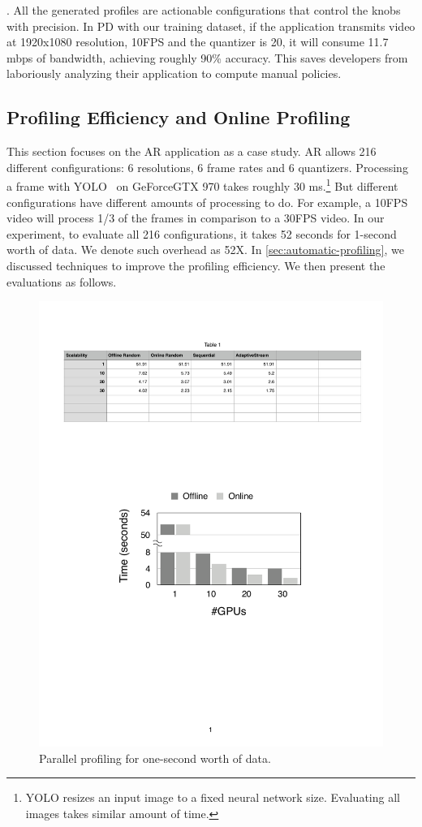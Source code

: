 . All the generated profiles are actionable
configurations that control the knobs with precision. In PD with our training
dataset, if the application transmits video at 1920x1080 resolution, 10FPS and
the quantizer is 20, it will consume 11.7 mbps of bandwidth, achieving roughly
90\% accuracy. This saves developers from laboriously analyzing their
application to compute manual policies.

\subsection{Profiling Efficiency and Online Profiling}
\label{sec:online-profiling}

This section focuses on the AR application as a case study. AR allows 216
different configurations: 6 resolutions, 6 frame rates and 6
quantizers. Processing a frame with YOLO~\cite{redmon2016yolo9000} on
GeForce\textregistered\space GTX 970 takes roughly 30 ms.\footnote{YOLO resizes
  an input image to a fixed neural network size. Evaluating all images takes
  similar amount of time.} But different configurations have different amounts
of processing to do. For example, a 10FPS video will process 1/3 of the frames
in comparison to a 30FPS video. In our experiment, to evaluate all 216
configurations, it takes 52 seconds for 1-second worth of data. We denote such
overhead as 52X. In \autoref{sec:automatic-profiling}, we discussed techniques
to improve the profiling efficiency. We then present the evaluations as follows.

\begin{figure}
  \centering
  \includegraphics[width=0.9\columnwidth]{figures/parallel.pdf}
  \caption{Parallel profiling for one-second worth of data.}
  \label{fig:parallel}
\end{figure}


